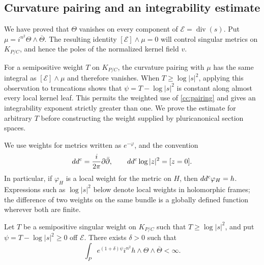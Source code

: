 \subsection{Curvature pairing and an integrability estimate}

We have proved that $\Theta$ vanishes on every component of
$\mathcal E=\operatorname{div}(s)$. Put
$\mu=i^{n^2}\Theta\wedge\overline\Theta$.
The resulting identity $[\mathcal E]\wedge\mu=0$ will control
singular metrics on $K_{P/C}$, and hence the poles of the normalized
kernel field $v$.

For a semipositive weight $T$ on $K_{P/C}$, the curvature pairing
with $\mu$ has the same integral as $[\mathcal E]\wedge\mu$ and
therefore vanishes. When $T\geq\log|s|^2$, applying this observation
to truncations shows that $\psi=T-\log|s|^2$ is constant along
almost every local kernel leaf. This permits the weighted use of
\eqref{cc:pairing} and gives an integrability exponent strictly
greater than one. We prove the estimate for arbitrary $T$ before
constructing the weight supplied by pluricanonical section spaces.

We use weights for metrics written as \(e^{-\varphi}\), and the convention
\[
 dd^c=\frac{i}{2\pi}\partial\bar\partial,
 \qquad dd^c\log|z|^2=[z=0].
\]
In particular, if \(\varphi_H\) is a local weight for the metric on
\(H\), then \(dd^c\varphi_H=h\).  Expressions such as
\(\log|s|^2\) below denote local weights in holomorphic frames; the
difference of two weights on the same bundle is a globally defined
function wherever both are finite.

\begin{lemma}\label{ca:integrability}
Let \(T\) be a semipositive singular weight on \(K_{P/C}\) such that
\(T\geq\log|s|^2\), and put
\(\psi=T-\log|s|^2\geq0\) off \(\mathcal E\).
There exists \(\delta>0\) such that
\begin{equation}\label{ca:global-integral}
 \int_P e^{(1+\delta)\psi}
       i^{n^2}h\wedge\Theta\wedge\overline\Theta<\infty.
\end{equation}
\end{lemma}

